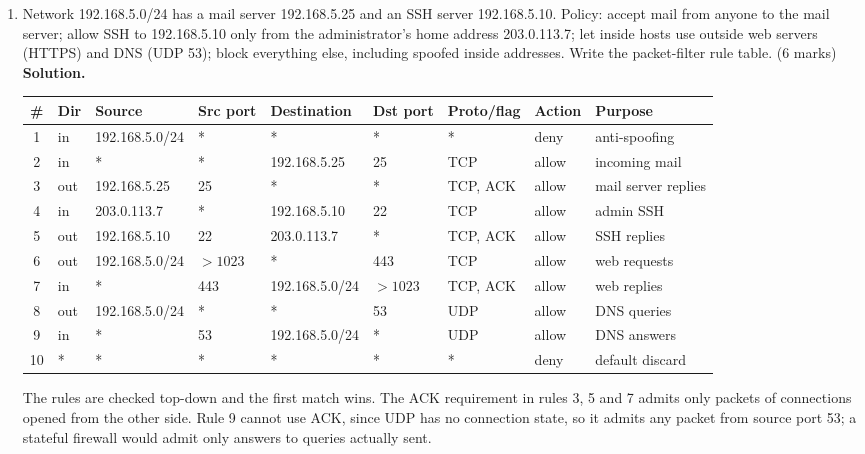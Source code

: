 \begin{enumerate}[leftmargin=1.6em,itemsep=4pt]
  \item Network 192.168.5.0/24 has a mail server 192.168.5.25 and an SSH server 192.168.5.10. Policy: accept mail from anyone to the mail server; allow SSH to 192.168.5.10 only from the administrator's home address 203.0.113.7; let inside hosts use outside web servers (HTTPS) and DNS (UDP 53); block everything else, including spoofed inside addresses. Write the packet-filter rule table. \hfill (6 marks)\\
  \textbf{Solution.}
  \begin{center}\small\setlength{\tabcolsep}{3.5pt}
  \begin{tabular}{@{}c l l l l l l l l@{}}
  \toprule
  \# & Dir & Source & Src port & Destination & Dst port & Proto/flag & Action & Purpose\\
  \midrule
  1 & in & 192.168.5.0/24 & * & * & * & * & deny & anti-spoofing\\
  2 & in & * & * & 192.168.5.25 & 25 & TCP & allow & incoming mail\\
  3 & out & 192.168.5.25 & 25 & * & * & TCP, ACK & allow & mail server replies\\
  4 & in & 203.0.113.7 & * & 192.168.5.10 & 22 & TCP & allow & admin SSH\\
  5 & out & 192.168.5.10 & 22 & 203.0.113.7 & * & TCP, ACK & allow & SSH replies\\
  6 & out & 192.168.5.0/24 & $>1023$ & * & 443 & TCP & allow & web requests\\
  7 & in & * & 443 & 192.168.5.0/24 & $>1023$ & TCP, ACK & allow & web replies\\
  8 & out & 192.168.5.0/24 & * & * & 53 & UDP & allow & DNS queries\\
  9 & in & * & 53 & 192.168.5.0/24 & * & UDP & allow & DNS answers\\
  10 & * & * & * & * & * & * & deny & default discard\\
  \bottomrule
  \end{tabular}
  \end{center}
  The rules are checked top-down and the first match wins. The ACK requirement in rules 3, 5 and 7 admits only packets of connections opened from the other side. Rule 9 cannot use ACK, since UDP has no connection state, so it admits any packet from source port 53; a stateful firewall would admit only answers to queries actually sent.


\end{enumerate}
